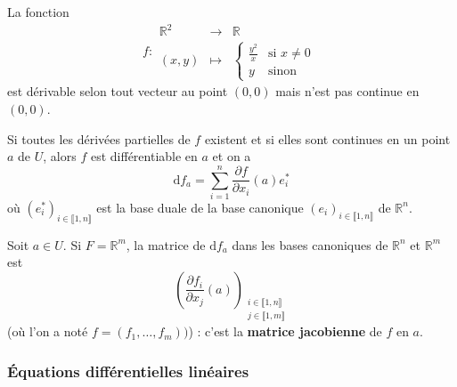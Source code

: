 	\begin{cexample}
		La fonction
		\[
			f :
			\begin{array}{ccc}
				\mathbb{R}^2 &\rightarrow& \mathbb{R} \\
				(x,y) &\mapsto& \begin{cases}
					\frac{y^2}{x} &\text{si } x \neq 0 \\
					y &\text{sinon}
				\end{cases}
			\end{array}
		\]
		est dérivable selon tout vecteur au point $(0,0)$ mais n'est pas continue en $(0,0)$.
	\end{cexample}
	
	\begin{theorem}
		Si toutes les dérivées partielles de $f$ existent et si elles sont continues en un point $a$ de $U$, alors $f$ est différentiable en $a$ et on a
		\[ \mathrm{d}f_a = \sum_{i=1}^n \frac{\partial f}{\partial x_i}(a) e_i^* \]
		où $(e_i^*)_{i \in \llbracket 1, n \rrbracket}$ est la base duale de la base canonique $(e_i)_{i \in \llbracket 1, n \rrbracket}$ de $\mathbb{R}^n$.
	\end{theorem}
	
	\begin{application}
		Soit $a \in U$. Si $F = \mathbb{R}^m$, la matrice de $\mathrm{d}f_a$ dans les bases canoniques de $\mathbb{R}^n$ et $\mathbb{R}^m$ est
		\[ \left(\frac{\partial f_i}{\partial x_j}(a)\right)_{\substack{i \in \llbracket 1, n \rrbracket \\ j \in \llbracket 1, m \rrbracket}} \]
		(où l'on a noté $f = (f_1, \dots, f_m))$) : c'est la \textbf{matrice jacobienne} de $f$ en $a$.
	\end{application}
	
	\subsubsection{Équations différentielles linéaires}
	
	

